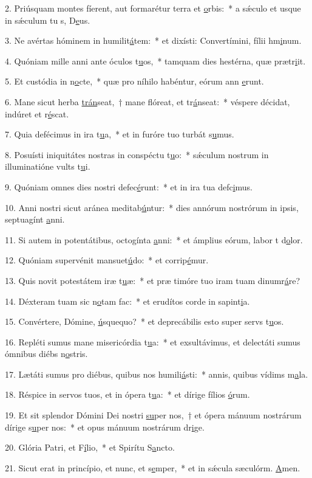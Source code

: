 2. Priúsquam montes fíerent, aut formarétur terra et \uline{o}rbis:~* a sǽculo et usque in sǽculum tu s, D\uline{e}us.\par 
3. Ne avértas hóminem in humilit\uline{á}tem:~* et dixísti: Convertímini, fílii hm\uline{i}num.\par 
4. Quóniam mille anni ante óculos t\uline{u}os,~* tamquam dies hestérna, quæ prætr\uline{i}it.\par 
5. Et custódia in n\uline{o}cte,~* quæ pro níhilo habéntur, eórum ann \uline{e}runt.\par 
6. Mane sicut herba \uline{trán}seat,~† mane flóreat, et tr\uline{á}nseat:~* véspere décidat, indúret et r\uline{é}scat.\par 
7. Quia defécimus in ira t\uline{u}a,~* et in furóre tuo turbát s\uline{u}mus.\par 
8. Posuísti iniquitátes nostras in conspéctu t\uline{u}o:~* sǽculum nostrum in illuminatióne vults t\uline{u}i.\par 
9. Quóniam omnes dies nostri defec\uline{é}runt:~* et in ira tua defc\uline{i}mus.\par 
10. Anni nostri sicut aránea meditab\uline{ú}ntur:~* dies annórum nostrórum in ipsis, septuagínt \uline{a}nni.\par 
11. Si autem in potentátibus, octogínta \uline{a}nni:~* et ámplius eórum, labor t d\uline{o}lor.\par 
12. Quóniam supervénit mansuet\uline{ú}do:~* et corrip\uline{é}mur.\par 
13. Quis novit potestátem iræ t\uline{u}æ:~* et præ timóre tuo iram tuam dinumr\uline{á}re?\par 
14. Déxteram tuam sic n\uline{o}tam fac:~* et erudítos corde in sapint\uline{i}a.\par 
15. Convértere, Dómine, \uline{ú}squequo?~* et deprecábilis esto super servs t\uline{u}os.\par 
16. Repléti sumus mane misericórdia t\uline{u}a:~* et exsultávimus, et delectáti sumus ómnibus diébs n\uline{o}stris.\par 
17. Lætáti sumus pro diébus, quibus nos humili\uline{á}sti:~* annis, quibus vídims m\uline{a}la.\par 
18. Réspice in servos tuos, et in ópera t\uline{u}a:~* et dírige fílios \uline{ó}rum.\par 
19. Et sit splendor Dómini Dei nostri \uline{su}per nos,~† et ópera mánuum nostrárum dírige s\uline{u}per nos:~* et opus mánuum nostrárum dr\uline{i}ge.\par 
20. Glória Patri, et F\uline{í}lio,~* et Spirítu S\uline{a}ncto.\par 
21. Sicut erat in princípio, et nunc, et s\uline{e}mper,~* et in sǽcula sæculórm. \uline{A}men.\par 
